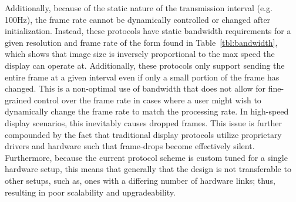     Additionally, because of the static nature of the transmission interval (e.g. 100Hz), the frame rate cannot be dynamically controlled or changed after initialization. Instead, these protocols have static bandwidth requirements for a given resolution and frame rate of the form found in Table~\ref{tbl:bandwidth}, which shows that image size is inversely proportional to the max speed the display can operate at. Additionally, these protocols only support sending the entire frame at a given interval even if only a small portion of the frame has changed. This is a non-optimal use of bandwidth that does not allow for fine-grained control over the frame rate in cases where a user might wish to dynamically change the frame rate to match the processing rate. In high-speed display scenarios, this inevitably causes dropped frames. This issue is further compounded by the fact that traditional display protocols utilize proprietary drivers and hardware such that frame-drops become effectively silent.  Furthermore, because the current protocol scheme is custom tuned for a single hardware setup, this means that generally that the design is not transferable to other setups, such as, ones with a differing number of hardware links; thus, resulting in poor scalability and upgradeability.


